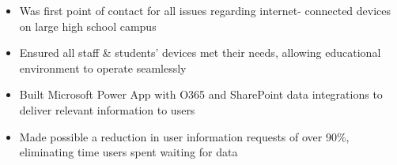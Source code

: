 \par\bigskip
{}
\par\smallskip
\begin{minipage}{13.75cm}
  \begin{minipage}{6.5cm}
    \begin{itemize}
      \item Was first point of contact for all issues regarding internet-
            connected devices on large high school campus
      \item Ensured all staff \& students' devices met their needs,
            allowing educational environment to operate seamlessly
    \end{itemize}
  \end{minipage}
  \hfill
  \begin{minipage}{6.5cm}
    \begin{itemize}
      \item Built Microsoft Power App with O365 and SharePoint data
            integrations to deliver relevant information to users
      \item Made possible a reduction in user information requests of
            over 90\%, eliminating time users spent waiting for data
    \end{itemize}
  \end{minipage}
\end{minipage}
\par\smallskip
\divider

